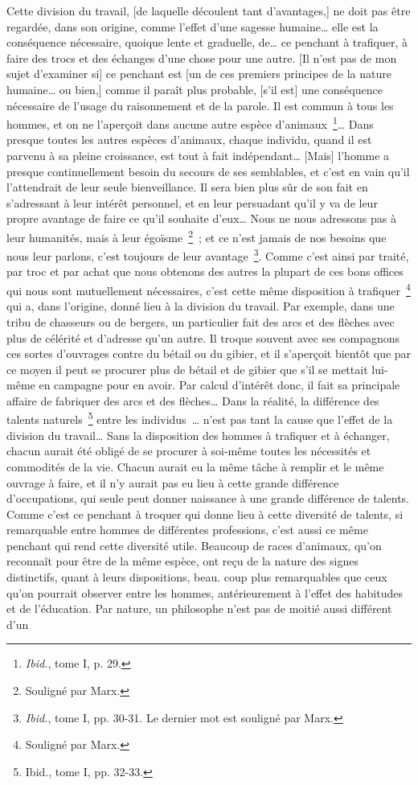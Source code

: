 \documentclass[french,twoside]{book} %
\newenvironment{quoteblock}%
  {\begin{quoting}}
  {\end{quoting}}
\newenvironment{quotebar}{%
    \def\FrameCommand{{\color{rubric!10!}\vrule width 0.5em} \hspace{0.9em}}%
    \def\OuterFrameSep{\itemsep} %
    \MakeFramed {\advance\hsize-\width \FrameRestore}
  }%
  {%
    \endMakeFramed
  }
\renewenvironment{quoteblock}%
  {%
    \savenotes
    \setstretch{0.9}
    \normalfont
    \begin{quotebar}
  }
  {%
    \end{quotebar}
    \spewnotes
  }
\begin{document}
\begin{quoteblock}
 \noindent Cette division du travail, [de laquelle découlent tant d’avantages,] ne doit pas être regardée, dans son origine, comme l’effet d’une sagesse humaine… elle est la conséquence nécessaire, quoique lente et graduelle, de… ce penchant à trafiquer, à faire des trocs et des échanges d’une chose pour une autre. [Il n’est pas de mon sujet d’examiner si] ce penchant est [un de ces premiers principes de la nature humaine… ou bien,] comme il paraît plus probable, [s’il est] une conséquence nécessaire de l’usage du raisonnement et de la parole. Il est commun à tous les hommes, et on ne l’aperçoit dans aucune autre espèce d’animaux \footnote{\emph{Ibid.}, tome I, p. 29.}… Dans presque toutes les autres espèces d’animaux, chaque individu, quand il est parvenu à sa pleine croissance, est tout à fait indépendant… [Mais] l’homme a presque continuellement besoin du secours de ses semblables, et c’est en vain qu’il l’attendrait de leur seule bienveillance. Il sera bien plus sûr de son fait en s’adressant à leur intérêt personnel, et en leur persuadant qu’il y va de leur propre avantage de faire ce qu’il souhaite d’eux… Nous ne nous adressons pas à leur humanités, mais à leur égoïsme \footnote{Souligné par Marx.} ; et ce n’est jamais de nos besoins que nous leur parlons, c’est toujours de leur avantage \footnote{\emph{Ibid.}, tome I, pp. 30-31. Le dernier mot est souligné par Marx.}. Comme c’est ainsi par traité, par troc et par achat que nous obtenons des autres la plupart de ces bons offices qui nous sont mutuellement nécessaires, c’est cette même disposition à trafiquer \footnote{Souligné par Marx.} qui a, dans l’origine, donné lieu à la division du travail. Par exemple, dans une tribu de chasseurs ou de bergers, un particulier fait des arcs et des flèches avec plus de célérité et d’adresse qu’un autre. Il troque souvent avec ses compagnons ces sortes d’ouvrages contre du bétail ou du gibier, et il s’aperçoit bientôt que par ce moyen il peut se procurer plus de bétail et de gibier que s’il se mettait lui-même en campagne pour en avoir. Par calcul d’intérêt donc, il fait sa principale affaire de fabriquer des arcs et des flèches… Dans la réalité, la différence des talents naturels \footnote{Ibid., tome I, pp. 32-33.} entre les individus … n’est pas tant la cause que l’effet de la division du travail… Sans la disposition des hommes à trafiquer et à échanger, chacun aurait été obligé de se procurer à soi-même toutes les nécessités et commodités de la vie. Chacun aurait eu la même tâche à remplir et le même ouvrage à faire, et il n’y aurait pas eu lieu à cette grande différence d’occupations, qui seule peut donner naissance à une grande différence de talents. Comme c’est ce penchant à troquer qui donne lieu à cette diversité de talents, si remarquable entre hommes de différentes professions, c’est aussi ce même penchant qui rend cette diversité utile. Beaucoup de races d’animaux, qu’on reconnaît pour être de la même espèce, ont reçu de la nature des signes distinctifs, quant à leurs dispositions, beau. coup plus remarquables que ceux qu’on pourrait observer entre les hommes, antérieurement à l’effet des habitudes et de l’éducation. Par nature, un philosophe n’est pas de moitié aussi différent d’un 
\end{quoteblock}
\end{document}
